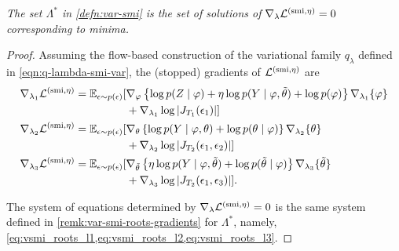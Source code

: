 {\it
  The set $\Lambda^*$ in \cref{defn:var-smi} is the set of solutions of $\nabla_{\lambda} \mathcal{L}^{( \operatorname{\text{smi}}, \eta)} = 0$ corresponding to minima.
}
\begin{proof}\label{proof:stop-gradient-loss}
  Assuming the flow-based construction of the variational family $q_{\lambda}$ defined in \cref{eqn:q-lambda-smi-var}, the (stopped) gradients of $\mathcal{L}^{( \operatorname{\text{smi}}, \eta)}$ are
  \begin{align}
    \nabla_{\lambda_1} \mathcal{L}^{( \operatorname{\text{smi}}, \eta)} = \operatorname{\mathbb{E}}_{\epsilon \sim p(\epsilon)}[ & \nabla_{\varphi} \left\{ \log p(Z \mid \varphi) + \eta \log p(Y \mid \varphi, \tilde\theta) + \log p(\varphi) \right\} \nabla_{\lambda_1} \{ \varphi \} \nonumber
    \\
                                                                                     & + \nabla_{\lambda_1} \log \left\vert J_{T_1}(\epsilon_1) \right\vert  ] \label{eq:grad_smi_loss_l1}
    \\
    \nabla_{\lambda_2} \mathcal{L}^{( \operatorname{\text{smi}}, \eta)} = \operatorname{\mathbb{E}}_{\epsilon \sim p(\epsilon)}[ & \nabla_{\theta} \left\{ \log p(Y \mid \varphi, \theta) + \log p(\theta \mid \varphi) \right\} \nabla_{\lambda_2} \{ \theta \} \nonumber
    \\
                                                                                     & + \nabla_{\lambda_2} \log \left\vert J_{T_2}(\epsilon_1,\epsilon_2) \right\vert  ] \label{eq:grad_smi_loss_l2}
    \\
    \nabla_{\lambda_3} \mathcal{L}^{( \operatorname{\text{smi}}, \eta)} = \operatorname{\mathbb{E}}_{\epsilon \sim p(\epsilon)}[ & \nabla_{\tilde\theta} \left\{ \eta \log p(Y \mid \varphi, \tilde\theta) + \log p(\tilde\theta \mid \varphi) \right\} \nabla_{\lambda_3} \{ \tilde\theta \} \nonumber
    \\
                                                                                     & + \nabla_{\lambda_3} \log \left\vert J_{T_2}(\epsilon_1,\epsilon_3) \right\vert  ]. \label{eq:grad_smi_loss_l3}
  \end{align}

  The system of equations determined by $\nabla_{\lambda} \mathcal{L}^{( \operatorname{\text{smi}}, \eta)} = 0$ is the same system defined in \cref{remk:var-smi-roots-gradients} for $\Lambda^*$, namely, \cref{eq:vsmi_roots_l1,eq:vsmi_roots_l2,eq:vsmi_roots_l3}.
\end{proof}


